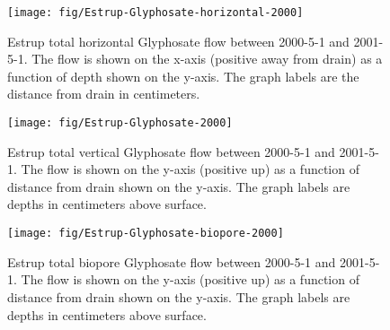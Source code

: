 \begin{figure}[htbp]
  \centering
  \texttt{[image: fig/Estrup-Glyphosate-horizontal-2000]}
  
  \caption{Estrup total horizontal Glyphosate flow between 2000-5-1 and
    2001-5-1.  The flow is shown on the x-axis (positive away from
    drain) as a function of depth shown on the y-axis.  The graph
    labels are the distance from drain in centimeters.}
  \label{fig:Estrup-Glyphosate-2000-horizontal}
\end{figure}\FloatBarrier

\begin{figure}[htbp]
  \centering
  \texttt{[image: fig/Estrup-Glyphosate-2000]}
  
  \caption{Estrup total vertical Glyphosate flow between 2000-5-1 and
    2001-5-1.  The flow is shown on the y-axis (positive up) as a
    function of distance from drain shown on the y-axis.  The graph
    labels are depths in centimeters above surface.}
  \label{fig:Estrup-Glyphosate-2000}
\end{figure}\FloatBarrier

\begin{figure}[htbp]
  \centering
  \texttt{[image: fig/Estrup-Glyphosate-biopore-2000]}
  
  \caption{Estrup total biopore Glyphosate flow between 2000-5-1 and
    2001-5-1.  The flow is shown on the y-axis (positive up) as a
    function of distance from drain shown on the y-axis.  The graph
    labels are depths in centimeters above surface.}
  \label{fig:Estrup-Glyphosate-biopore-2000}
\end{figure}\FloatBarrier


